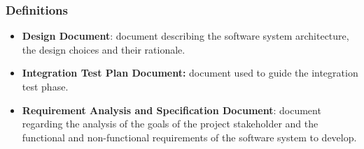 \subsubsection{Definitions}

\begin{itemize}
	\item \textbf{Design Document}: document describing the software system architecture, the design choices and their rationale.
	\item \textbf{Integration Test Plan Document:} document used to guide the integration test phase.
	\item \textbf{Requirement Analysis and Specification Document}: document regarding the analysis of the goals of the project stakeholder and the functional and non-functional requirements of the software system to develop.
\end{itemize}
